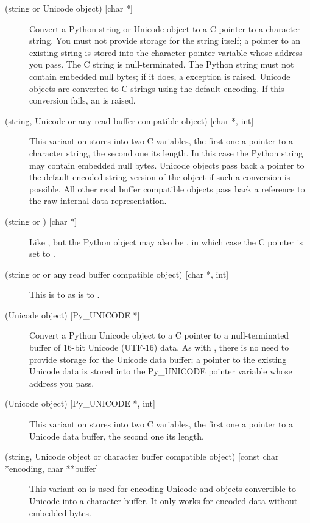 \begin{description}

\item[ (string or Unicode object) {[char *]}]
Convert a Python string or Unicode object to a C pointer to a
character string.  You must not provide storage for the string
itself; a pointer to an existing string is stored into the character
pointer variable whose address you pass.  The C string is
null-terminated.  The Python string must not contain embedded null
bytes; if it does, a  exception is raised.
Unicode objects are converted to C strings using the default
encoding. If this conversion fails, an  is
raised.

\item[ (string, Unicode or any read buffer compatible object) 
{[char *, int]}]
This variant on  stores into two C variables, the first one a
pointer to a character string, the second one its length.  In this
case the Python string may contain embedded null bytes.  Unicode
objects pass back a pointer to the default encoded string version of the
object if such a conversion is possible. All other read buffer
compatible objects pass back a reference to the raw internal data
representation.

\item[ (string or ) {[char *]}]
Like , but the Python object may also be , in which
case the C pointer is set to \NULL.

\item[ (string or  or any read buffer compatible object) 
{[char *, int]}]
This is to  as  is to .

\item[ (Unicode object) {[Py_UNICODE *]}]
Convert a Python Unicode object to a C pointer to a null-terminated
buffer of 16-bit Unicode (UTF-16) data.  As with , there is no need
to provide storage for the Unicode data buffer; a pointer to the
existing Unicode data is stored into the Py_UNICODE pointer variable whose
address you pass.  

\item[ (Unicode object) {[Py_UNICODE *, int]}]
This variant on  stores into two C variables, the first one
a pointer to a Unicode data buffer, the second one its length.

\item[ (string, Unicode object or character buffer compatible
object) {[const char *encoding, char **buffer]}]
This variant on  is used for encoding Unicode and objects
convertible to Unicode into a character buffer. It only works for
encoded data without embedded \NULL{} bytes.


\end{description}
